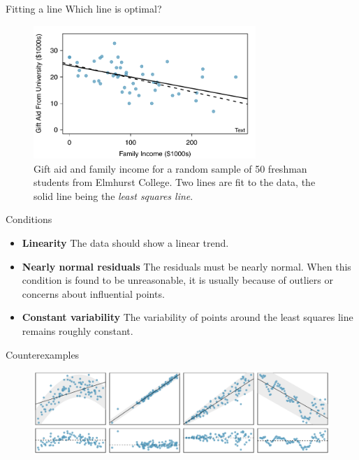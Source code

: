 \documentclass[12pt,a4paper]{beamer}
\begin{document}
\begin{frame}{Fitting a line}
	Which line is optimal?
	\begin{figure}
	\centering
	\includegraphics[width=0.75\textwidth]{figures/elmhurstPlots/elmhurstScatterW2Lines}
	\caption{\small Gift aid and family income for a random sample of 50 freshman students from Elmhurst College. Two lines are fit to the data, the solid line being the \emph{least squares line}.}
	\label{elmhurstScatterW2Lines}
	\end{figure}
\end{frame}
\begin{frame}{Conditions }
	\begin{itemize}
		\item \textbf{Linearity} The data should show a linear trend. 
		\item \textbf{Nearly normal residuals} The residuals must be nearly normal.
		When this condition is found to be unreasonable, it is usually because of outliers or concerns about influential points.
		\item \textbf{Constant variability} The variability of points around the least squares line remains roughly constant.
	\end{itemize}
\end{frame}
\begin{frame}{Counterexamples}
	\begin{figure}
	\centering
	\includegraphics[width=\textwidth]{figures/whatCanGoWrongWithLinearModel/whatCanGoWrongWithLinearModel}
\end{figure}
\end{frame}
\end{document}
